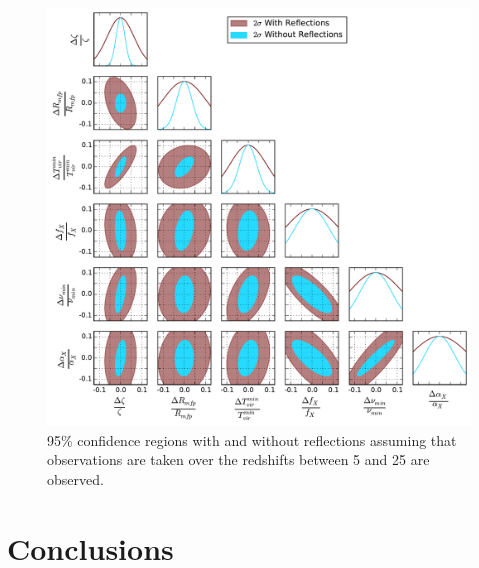 \documentclass[onecolumn]{emulateapj}
\begin{document}
\begin{figure}
\includegraphics[width=\textwidth]{figures/triangle_hera331.pdf}
\caption{95\% confidence regions with and without reflections assuming that observations are taken over the redshifts between 5 and 25 are observed.}
\end{figure}


\section{Conclusions}
\label{sec:Conclusion}



\appendix
\end{document}
